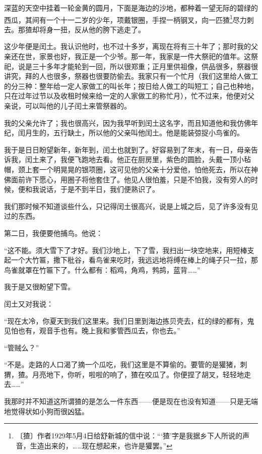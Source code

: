 \documentclass[12pt,UTF-8,openany]{ctexbook}
\begin{document}
\begin{large}
    
    深蓝的天空中挂着一轮金黄的圆月，下面是海边的沙地，都种着一望无际的碧绿的西瓜，其间有一个十一二岁的少年，项戴银圈，手捏一柄钢叉，向一匹猹\footnote{〔猹〕作者1929年5月4日给舒新城的信中说：“‘猹’字是我据乡下人所说的声音，生造出来的，……现在想起来，也许是獾罢。”}尽力刺去。那猹却将身一扭，反从他的胯下逃走了。
    
    这少年便是闰土。我认识他时，也不过十多岁，离现在将有三十年了；那时我的父亲还在世，家景也好，我正是一个少爷。那一年，我家是一件大祭祀的值年。这祭祀，说是三十多年才能轮到一回，所以很郑重；正月里供祖像，供品很多，祭器很讲究，拜的人也很多，祭器也很要防偷去。我家只有一个忙月（我们这里给人做工的分三种：整年给一定人家做工的叫长年；按日给人做工的叫短工；自己也种地，只在过年过节以及收租时候来给一定的人家做工的称忙月），忙不过来，他便对父亲说，可以叫他的儿子闰土来管祭器的。
    
    我的父亲允许了；我也很高兴，因为我早听到闰土这名字，而且知道他和我仿佛年纪，闰月生的，五行缺土，所以他的父亲叫他闰土。他是能装弶捉小鸟雀的。
    
    我于是日日盼望新年，新年到，闰土也就到了。好容易到了年末，有一日，母亲告诉我，闰土来了，我便飞跑地去看。他正在厨房里，紫色的圆脸，头戴一顶小毡帽，颈上套一个明晃晃的银项圈，这可见他的父亲十分爱他，怕他死去，所以在神佛面前许下愿心，用圈子将他套住了。他见人很怕羞，只是不怕我，没有旁人的时候，便和我说话，于是不到半日，我们便熟识了。
    
    我们那时候不知道谈些什么，只记得闰土很高兴，说是上城之后，见了许多没有见过的东西。
    
    第二日，我便要他捕鸟。他说：
    
    “这不能。须大雪下了才好。我们沙地上，下了雪，我扫出一块空地来，用短棒支起一个大竹匾，撒下秕谷，看鸟雀来吃时，我远远地将缚在棒上的绳子只一拉，那鸟雀就罩在竹匾下了。什么都有：稻鸡，角鸡，鹁鸪，蓝背……”
    
    我于是又很盼望下雪。
    
    闰土又对我说：
    
    “现在太冷，你夏天到我们这里来。我们日里到海边拣贝壳去，红的绿的都有，鬼见怕也有，观音手也有。晚上我和爹管西瓜去，你也去。”
    
    “管贼么？”
    
    “不是。走路的人口渴了摘一个瓜吃，我们这里是不算偷的。要管的是獾猪，刺猬，猹。月亮地下，你听，啦啦的响了，猹在咬瓜了。你便捏了胡叉，轻轻地走去……”
    
    我那时并不知道这所谓猹的是怎么一件东西——便是现在也没有知道——只是无端地觉得状如小狗而很凶猛。
    

\end{large}
\end{document}
